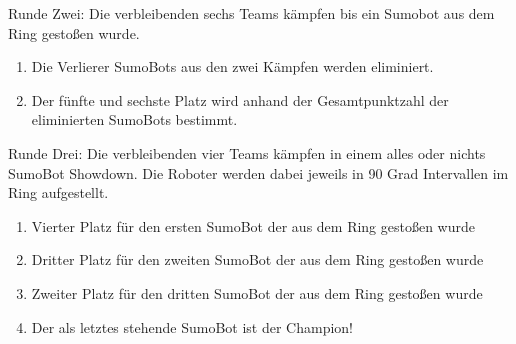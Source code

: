 \documentclass[a4paper,12pt]{article}
\begin{document}
Runde Zwei: Die verbleibenden sechs Teams kämpfen bis ein Sumobot aus dem Ring gestoßen wurde.
\begin{enumerate}
	\item Die Verlierer SumoBots aus den zwei Kämpfen werden eliminiert.
	\item Der fünfte und sechste Platz wird anhand der Gesamtpunktzahl der eliminierten SumoBots bestimmt.
\end{enumerate}

Runde Drei: Die verbleibenden vier Teams kämpfen in einem alles oder nichts SumoBot Showdown. Die Roboter werden dabei jeweils in 90 Grad Intervallen im Ring aufgestellt.
 \begin{enumerate}
	 \item Vierter Platz für den ersten SumoBot der aus dem Ring gestoßen wurde
	 \item Dritter Platz für den zweiten SumoBot der aus dem Ring gestoßen wurde
	 \item Zweiter Platz für den dritten SumoBot der aus dem Ring gestoßen wurde
	 \item Der als letztes stehende SumoBot ist der Champion!
 \end{enumerate}
\end{document}
